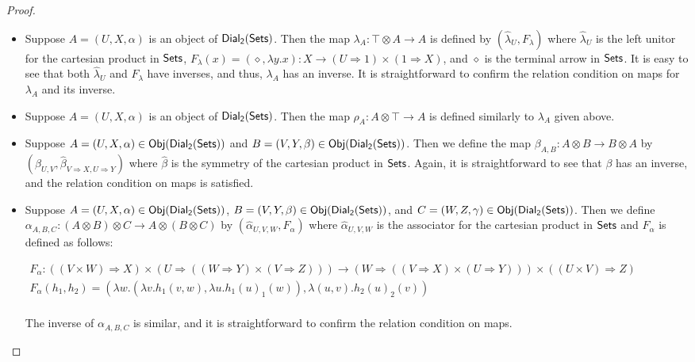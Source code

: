 \begin{proof}
\begin{center}
\begin{itemize}
    \item Suppose $A = (U,X,\alpha)$ is an object of $\mathsf{Dial_2}(\mathsf{Sets})$.  Then
      the map $\lambda_A : \top \otimes A \to A$ is defined by
      $(\hat{\lambda}_U,F_\lambda)$ where
      $\hat{\lambda}_U$ is the left unitor for the cartesian product in $\mathsf{Sets}$,
      $F_\lambda(x) = (\diamond,\lambda y.x) : X \to (U \Rightarrow 1) \times (1 \Rightarrow X)$, 
      and $\diamond$ is the terminal arrow in $\mathsf{Sets}$.
      It is easy to see that both
      $\hat{\lambda}_U$ and $F_\lambda$ have
      inverses, and thus, $\lambda_A$ has an inverse. It is straightforward to confirm the relation condition on maps
      for $\lambda_A$ and its inverse.

    \item Suppose $A = (U,X,\alpha)$ is an object of $\mathsf{Dial_2}(\mathsf{Sets})$.  Then
      the map $\rho_A : A \otimes \top \to A$ is defined similarly to
      $\lambda_A$ given above.

    \item Suppose $A = (U,X,\alpha) \in \mathsf{Obj}(\mathsf{Dial_2}(\mathsf{Sets}))$ and
      $B = (V,Y,\beta) \in \mathsf{Obj}(\mathsf{Dial_2}(\mathsf{Sets}))$.  Then we define the map
      $\beta_{A,B} : A \otimes B \to B \otimes A$ by
      $(\hat{\beta}_{U,V}, \hat{\beta}_{V \Rightarrow X,U \Rightarrow
        Y})$
      where $\hat{\beta}$ is the symmetry of the cartesian product in
      $\mathsf{Sets}$.  Again, it is straightforward to see that $\beta$ has
      an inverse, and the relation condition on maps is satisfied.

    \item Suppose $A = (U,X,\alpha) \in \mathsf{Obj}(\mathsf{Dial_2}(\mathsf{Sets}))$,
      $B = (V,Y,\beta) \in \mathsf{Obj}(\mathsf{Dial_2}(\mathsf{Sets}))$, and
      $C = (W,Z,\gamma) \in \mathsf{Obj}(\mathsf{Dial_2}(\mathsf{Sets}))$.  Then we define
      $\alpha_{A,B,C} : (A \otimes B) \otimes C \to A \otimes (B \otimes C)$
      by $(\hat{\alpha}_{U,V,W}, F_\alpha)$ where
      $\hat{\alpha}_{U,V,W}$ is the associator for the cartesian
      product in $\mathsf{Sets}$ and $F_\alpha$ is defined as follows:
      \begin{center}
        \scriptsize
        \begin{math}
          \begin{array}{lll}
            F_\alpha : ((V \times W) \Rightarrow X) \times (U \Rightarrow ((W \Rightarrow Y) \times (V \Rightarrow Z))) \to 
            (W \Rightarrow ((V \Rightarrow X) \times (U \Rightarrow Y))) \times ((U \times V) \Rightarrow Z)\\
            F_\alpha(h_1,h_2) = (\lambda w.(\lambda v.h_1(v,w),\lambda u.h_1(u)_1(w)), \lambda (u,v).h_2(u)_2(v))\\
          \end{array}
        \end{math}
      \end{center}
      The inverse of $\alpha_{A,B,C}$ is similar, and it is
      straightforward to confirm the relation condition on maps.


\end{itemize}
\end{center}
\end{proof}
